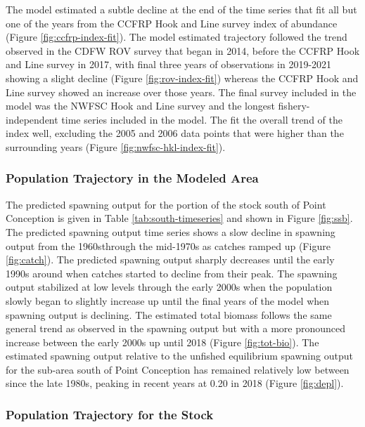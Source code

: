 \documentclass[11pt,
  english,
  letterpaper,
]{article}
\begin{document}
The model estimated a subtle decline at the end of the time series that fit all but one of the years from the CCFRP Hook and Line survey index of abundance (Figure \ref{fig:ccfrp-index-fit}). The model estimated trajectory followed the trend observed in the CDFW ROV survey that began in 2014, before the CCFRP Hook and Line survey in 2017, with final three years of observations in 2019-2021 showing a slight decline (Figure \ref{fig:rov-index-fit}) whereas the CCFRP Hook and Line survey showed an increase over those years. The final survey included in the model was the NWFSC Hook and Line survey and the longest fishery-independent time series included in the model. The fit the overall trend of the index well, excluding the 2005 and 2006 data points that were higher than the surrounding years (Figure \ref{fig:nwfsc-hkl-index-fit}).

\hypertarget{population-trajectory-in-the-modeled-area}{%
\subsubsection{Population Trajectory in the Modeled Area}\label{population-trajectory-in-the-modeled-area}}

The predicted spawning output for the portion of the stock south of Point Conception is given in Table \ref{tab:south-timeseries} and shown in Figure \ref{fig:ssb}. The predicted spawning output time series shows a slow decline in spawning output from the 1960sthrough the mid-1970s as catches ramped up (Figure \ref{fig:catch}). The predicted spawning output sharply decreases until the early 1990s around when catches started to decline from their peak. The spawning output stabilized at low levels through the early 2000s when the population slowly began to slightly increase up until the final years of the model when spawning output is declining. The estimated total biomass follows the same general trend as observed in the spawning output but with a more pronounced increase between the early 2000s up until 2018 (Figure \ref{fig:tot-bio}). The estimated spawning output relative to the unfished equilibrium spawning output for the sub-area south of Point Conception has remained relatively low between since the late 1980s, peaking in recent years at 0.20 in 2018 (Figure \ref{fig:depl}).

\hypertarget{population-trajectory-for-the-stock}{%
\subsubsection{Population Trajectory for the Stock}\label{population-trajectory-for-the-stock}}
\end{document}
